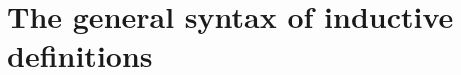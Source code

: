 \documentclass[hott-all.tex]{subfiles}
\begin{document}
\section{The general syntax of inductive definitions}
% 
% 
% 
% 
% 
\end{document}
